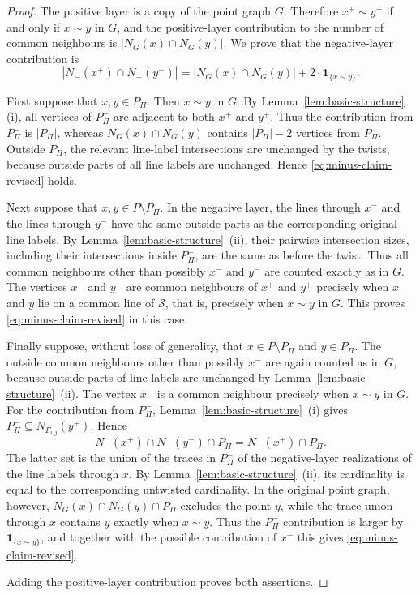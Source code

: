 \documentclass[reqno,a4paper,11pt]{article}
\theoremstyle{definition}
\theoremstyle{remark}
\begin{document}
\begin{proof}
The positive layer is a copy of the point graph $G$.
Therefore
$
x^+\sim y^+$ if and only if  $x\sim y$ in $G$,
and the positive-layer contribution to the number of common neighbours is
$|N_G(x)\cap N_G(y)|.$
We prove that the negative-layer contribution is
\begin{equation}\label{eq:minus-claim-revised}
|N_-(x^+)\cap N_-(y^+)|
=
|N_G(x)\cap N_G(y)|+2\cdot\mathbf 1_{\{x\sim y\}}.
\end{equation}

First suppose that $x,y\in P_\Pi$.
Then $x\sim y$ in $G$.
By Lemma~\ref{lem:basic-structure}(i), all vertices of $P_\Pi^-$ are adjacent to both $x^+$ and $y^+$.
Thus the contribution from $P_\Pi^-$ is $|P_\Pi|$, whereas $N_G(x)\cap N_G(y)$ contains $|P_\Pi|-2$ vertices from $P_\Pi$.
Outside $P_\Pi$, the relevant line-label intersections are unchanged by the twists, because outside parts of all line labels are unchanged.
Hence \eqref{eq:minus-claim-revised} holds.

Next suppose that $x,y\in P\setminus P_\Pi$.
In the negative layer, the lines through $x^-$ and the lines through $y^-$ have the same outside parts as the corresponding original line labels.
By Lemma~\ref{lem:basic-structure}~(ii), their pairwise intersection sizes, including their intersections inside $P_\Pi^-$, are the same as before the twist.
Thus all common neighbours other than possibly $x^-$ and $y^-$ are counted exactly as in $G$.
The vertices $x^-$ and $y^-$ are common neighbours of $x^+$ and $y^+$ precisely when $x$ and $y$ lie on a common line of $\mathcal S$, that is, precisely when $x\sim y$ in $G$.
This proves \eqref{eq:minus-claim-revised} in this case.

Finally suppose, without loss of generality, that $x\in P\setminus P_\Pi$ and $y\in P_\Pi$.
The outside common neighbours other than possibly $x^-$ are again counted as in $G$, because outside parts of line labels are unchanged by Lemma~\ref{lem:basic-structure}~(ii).
The vertex $x^-$ is a common neighbour precisely when $x\sim y$ in $G$.
For the contribution from $P_\Pi^-$, Lemma~\ref{lem:basic-structure}~(i) gives
$P_\Pi^-\subseteq N_{\Gamma_{i,j}}(y^+).$
Hence
\[
N_-(x^+)\cap N_-(y^+)\cap P_\Pi^-=N_-(x^+)\cap P_\Pi^-.
\]
The latter set is the union of the traces in $P_\Pi^-$ of the negative-layer realizations of the line labels through $x$.
By Lemma~\ref{lem:basic-structure}~(ii), its cardinality is equal to the corresponding untwisted cardinality.
In the original point graph, however, $N_G(x)\cap N_G(y)\cap P_\Pi$ excludes the point $y$, while the trace union through $x$ contains $y$ exactly when $x\sim y$.
Thus the $P_\Pi^-$ contribution is larger by $\mathbf 1_{\{x\sim y\}}$, and together with the possible contribution of $x^-$ this gives \eqref{eq:minus-claim-revised}.

Adding the positive-layer contribution proves both assertions.
\end{proof}
\end{document}
